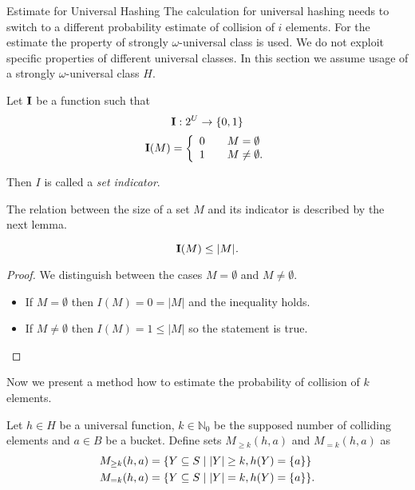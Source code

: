 \begin{section}{Estimate for Universal Hashing}
The calculation for universal hashing needs to switch to a different probability estimate of collision of $i$ elements. For the estimate the property of strongly $\omega$-universal class is used. We do not exploit specific properties of different universal classes. In this section we assume usage of a strongly $\omega$-universal class $H$.
\begin{definition}
Let $\mathbf{I}$ be a function such that
\begin{displaymath}
\mathbf{I}: 2^U \rightarrow \lbrace 0, 1 \rbrace
\end{displaymath}
\begin{displaymath}
\mathbf{I}(M) = \left\{ 
\begin{array}{l l}
  0 & \quad M = \emptyset \\
  1 & \quad M \neq \emptyset \text{.} \\
\end{array} \right. 
\end{displaymath}

Then $I$ is called a \emph{set indicator}.
\end{definition}

The relation between the size of a set $M$ and its indicator is described by the next lemma.
\begin{lemma}
\[\mathbf{I}(M) \leq |M| \textit{.} \]
\end{lemma}
\begin{proof} We distinguish between the cases $M = \emptyset$ and $M \neq \emptyset$.
\begin{itemize}
\item If $M = \emptyset$ then $I(M) = 0 = |M|$ and the inequality holds. 
\item If $M \neq \emptyset$ then $I(M) = 1 \leq |M|$ so the statement is true.
\end{itemize}
\end{proof}

Now we present a method how to estimate the probability of collision of $k$ elements.
\begin{definition}
Let $h \in H$ be a universal function, $k \in \mathbb{N}_0$ be the supposed number of colliding elements and $a \in B$ be a bucket. Define sets $M_{\geq k}(h, a)$ and $M_{= k}(h, a)$ as
\begin{displaymath}
\begin{split}
M_{\geq k}(h, a) & = \{Y \subseteq S \mid |Y| \geq k, h(Y) = \{a\}\} \\
M_{= k}(h, a) & = \{Y \subseteq S \mid |Y| = k, h(Y) = \{a\}\}  \text{.}
\end{split}
\end{displaymath}
\end{definition}


\end{section}
